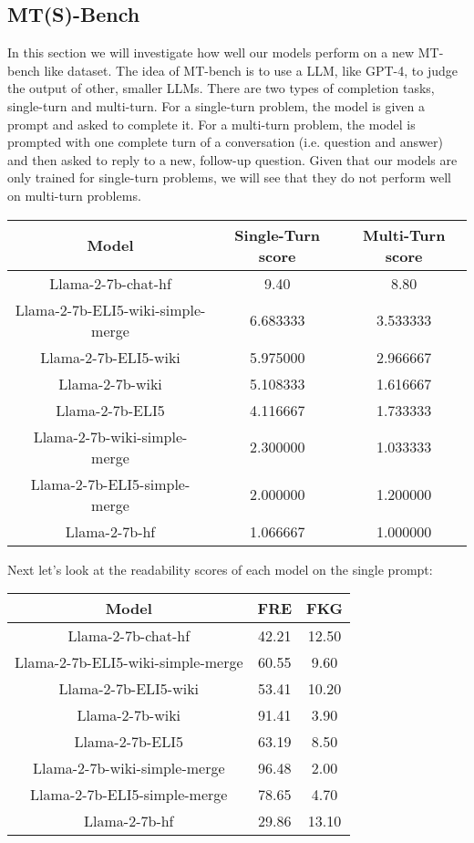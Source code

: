\documentclass[11pt, oneside]{article}   	%
\begin{document}
\subsection{MT(S)-Bench}

In this section we will investigate how well our models perform on a new MT-bench like dataset.
The idea of MT-bench is to use a LLM, like GPT-4, to judge the output of other, smaller LLMs. 
There are two types of completion tasks, single-turn and multi-turn.
For a single-turn problem, the model is given a prompt and asked to complete it.
For a multi-turn problem, the model is prompted with one complete turn of a conversation (i.e. question and answer) and then asked to reply to a new, follow-up question. 
Given that our models are only trained for single-turn problems, we will see that they do not perform well on multi-turn problems.

\begin{center}
\begin{tabular}{c|c|c}
    \hline
    \textbf{Model} & \textbf{Single-Turn score}& \textbf{Multi-Turn score} \\
    \hline
    Llama-2-7b-chat-hf &  9.40 & 8.80\\ 
    Llama-2-7b-ELI5-wiki-simple-merge & 6.683333 & 3.533333  \\
    Llama-2-7b-ELI5-wiki &  5.975000 &  2.966667 \\
    Llama-2-7b-wiki &  5.108333 & 1.616667  \\
    Llama-2-7b-ELI5 &  4.116667 & 1.733333  \\
    Llama-2-7b-wiki-simple-merge &  2.300000& 1.033333  \\
    Llama-2-7b-ELI5-simple-merge & 2.000000 & 1.200000  \\
    Llama-2-7b-hf & 1.066667 &1.000000 \\
    \hline
\end{tabular}
\end{center}

Next let's look at the readability scores of each model on the single prompt:

\begin{center}
\begin{tabular}{c|c|c}
    \hline
    \textbf{Model} & \textbf{FRE}& \textbf{FKG} \\
    \hline
    Llama-2-7b-chat-hf &  42.21 & 12.50 \\ 
    Llama-2-7b-ELI5-wiki-simple-merge & 60.55 & 9.60  \\
    Llama-2-7b-ELI5-wiki &  53.41 &  10.20 \\
    Llama-2-7b-wiki &  91.41 & 3.90 \\
    Llama-2-7b-ELI5 &  63.19 & 8.50 \\
    Llama-2-7b-wiki-simple-merge &  96.48& 2.00  \\
    Llama-2-7b-ELI5-simple-merge & 78.65 & 4.70  \\
    Llama-2-7b-hf & 29.86 &13.10 \\
    \hline
\end{tabular}
\end{center}
\end{document}
